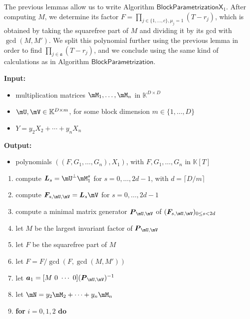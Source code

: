 \documentclass[12pt]{article}
\newcommand{\mat}[1]{\bm{\MakeUppercase{#1}}} %
\newcommand{\row}[1]{\bm{\MakeLowercase{#1}}} %
\newcommand{\seqelt}[1]{\bm{F}_{#1}} %
\newcommand{\mainalgoname}{\mathsf{ BlockParametrization}}
\newcommand{\mf}{Y}
\def\K{\mathbb{K}}
\def\K {\ensuremath{\mathbb{K}}}
\begin{document}
The previous lemmas allow us to write Algorithm
$\mathsf{BlockParametrizationX}_1$. After computing $M$, we determine its
factor $F=\prod_{j \in \{1,\dots,c\}, \mu_j=1} (T-r_j)$, which is
obtained by taking the squarefree part of $M$ and dividing it by
its gcd with $\gcd(M,M')$. We split this polynomial further using the previous
lemma in order to find $\prod_{j \in \mathfrak{a}} (T-r_j)$, and we
conclude using the same kind of calculations as in Algorithm
$\mainalgoname$.

\begin{algorithm}[H]
	\caption{$\mainalgoname{\sf X}_1(\mM_1,\dots,\mM_n,\mU,\mV,\mf$)}
	{\bf Input:} \vspace{-0.5em}
	\begin{itemize}
		\item multiplication matrices $\mM_1,\dots,\mM_n$ in $\K^{D \times D}$
		\item  $\mU,\mV \in \mathbb{K}^{D \times m}$, for some block dimension  $m \in \{1,\dots,D\}$
                \item $\mf =y_2 X_2 + \cdots + y_n X_n$
	\end{itemize}
	{\bf Output:}  \vspace{-0.5em}
        \begin{itemize}
        \item polynomials $((F,G_1,\dots,G_n),X_1)$, with $F,G_1,\dots,G_n$ in $\K[T]$
        \end{itemize}
  \begin{enumerate}
  \item\label{X1step3} { compute $\mat{L}_s = \mU^{\perp}\mM_1^s$ for $s=0,\dots,2d-1$, with $d = \lceil D/m \rceil$}
  \item\label{X1step4} { compute $\seqelt{s,\mU,\mV}= \mat{L}_s\mV$ for $s=0,\dots, 2d-1$}
  \item\label{X1step5} { compute a minimal matrix generator $\mat{P}_{\mU,\mV}$ of $(\seqelt{s,\mU,\mV})_{0 \le s < 2d}$}
  \item\label{X1step6} { let $M$ be the largest invariant factor of $\mat{P}_{\mU,\mV}$}
  \item\label{X1step7} { let $F$ be  the squarefree part  of $M$}
  \item\label{X1step7b} let $F = F /\gcd(F, \gcd (M, M'))$
  \item\label{X1step8} { let $\row{a}_1 = [M~0 ~\cdots~ 0] (\mat{P}_{\mU,\mV})^{-1}$}
  \item let $\mN = y_2 \mM_2 + \cdots+y_n \mM_n$
  \item \textbf{for} $i=0,1,2$ \textbf{do} \\

\end{enumerate}
\end{algorithm}
\end{document}
